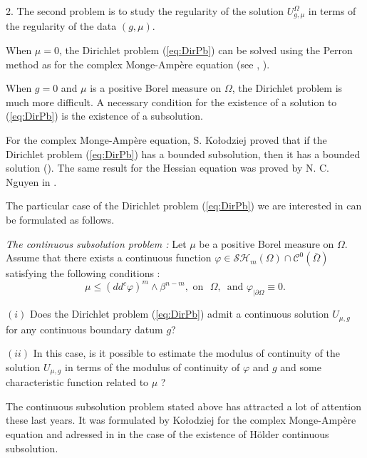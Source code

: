 \documentclass[12pt]{amsart}
\theoremstyle{definition}
\numberwithin{theorem}{section}
\numberwithin{equation}{section}
\begin{document}
2.  The second problem is to study the regularity of the solution $U^{\Omega}_{g,\mu}$ in terms of the regularity of the data $(g,\mu)$.


\smallskip

When $\mu = 0$, the Dirichlet problem (\ref{eq:DirPb}) can be solved using the Perron method as for the complex Monge-Amp\`ere equation (see \cite{Bl05}, \cite{Ch16a}).

When $g = 0$ and $\mu$ is a positive Borel measure on $\Omega$, the Dirichlet problem is much more difficult. A necessary condition for the existence of a solution to (\ref{eq:DirPb}) is  the existence of a subsolution.  

For the complex Monge-Amp\`ere equation, S. Ko\l odziej proved that if the Dirichlet problem (\ref{eq:DirPb}) has a bounded subsolution, then it has a bounded solution (\cite{Kol95}). The same result for the Hessian equation was proved by  N. C. Nguyen in \cite{N13}.

The particular case of the Dirichlet problem (\ref{eq:DirPb}) we are interested in can be formulated as follows.    

\smallskip

 
{\it The continuous subsolution problem :}
 Let $\mu$ be a positive Borel measure on $\Omega$. Assume that there exists a continuous function $\varphi \in  \mathcal{SH}_m (\Omega) \cap \mathcal{C}^{0} (\bar{\Omega})$ satisfying the following conditions :
\begin{equation} \label{eq:subsolution}
\mu \leq (dd^c \varphi)^m \wedge \beta^{n - m}, \, \, \mathrm{on} \, \, \, \, \Omega,  
\, \, \, \mathrm{and} \, \, \varphi_{\mid  \partial \Omega} \equiv 0.
\end{equation}

$(i)$  Does the  Dirichlet problem (\ref{eq:DirPb}) admit a continuous  solution $U_{\mu,g}$ for any continuous boundary datum $g$? 
 
$(ii)$ In this case, is it possible to estimate  the modulus of continuity of the solution $U_{\mu,g}$ in terms of the modulus of continuity of  $\varphi$ and $g$ and some characteristic function related to $\mu$ ?

\smallskip

The continuous subsolution problem stated above has attracted a lot of attention these last years. It was formulated by Ko\l odziej  for the complex Monge-Amp\`ere equation and  adressed in \cite{DGZ16} in the case of the existence of H\"older continuous subsolution. 
\end{document}
